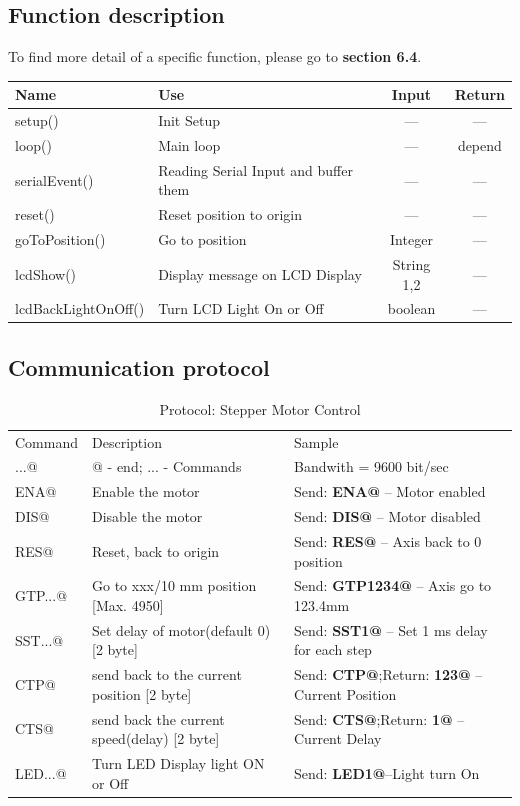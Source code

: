 \documentclass[11pt,a4paper]{article}
\begin{document}
\subsection{Function description}
To find more detail of a specific function, please go to \textbf{section 6.4}.\\
\begin{table}[h!]
\centering
\begin{tabular}{ |l | l | c |c |}
	\hline
	Name & Use & Input & Return\\
	\hline
	setup() & Init Setup & --- & ---\\
	loop() & Main loop & --- & depend\\
	serialEvent() & Reading Serial Input and buffer them & --- & ---\\
	reset() & Reset position to origin & --- & ---\\
	goToPosition() & Go to position & Integer & ---\\
	lcdShow() & Display message on LCD Display & String 1,2 & ---\\
	lcdBackLightOnOff()   & Turn LCD Light On or Off & boolean & ---\\
	\hline
	
\end{tabular}
\end{table}

\newpage
\subsection{Communication protocol}
\begin{table}[h!]
\centering
\begin{tabular}{ ||l | l | l ||}
	\hline
	Command & Description & Sample\\
	...@ & @ - end; ... - Commands & Bandwith = 9600 bit/sec \\ \hline\hline
	ENA@ &Enable the motor & Send: \textbf{ENA@} -- Motor enabled\\
	DIS@ &Disable the motor& Send: \textbf{DIS@} -- Motor disabled\\
	RES@ &Reset, back to origin& Send: \textbf{RES@} -- Axis back to 0 position\\
	GTP...@ & Go to xxx/10 mm position	[Max. 4950]& Send: \textbf{GTP1234@} -- Axis go to 123.4mm\\
	SST...@ & Set delay of motor(default 0)	[2 byte]& Send: \textbf{SST1@} -- Set 1 ms delay for each step\\
	CTP@ & send back to the current position [2 byte]& Send: \textbf{CTP@};Return: \textbf{123@}  -- Current Position\\
	CTS@ & send back the current speed(delay) [2 byte]& Send: \textbf{CTS@};Return: \textbf{1@}  -- Current Delay\\	
	LED...@ & Turn LED Display light ON or Off & Send: \textbf{LED1@}--Light turn On\\
		\hline
\end{tabular}
\caption{Protocol: Stepper Motor Control} 
\end{table}
\end{document}
